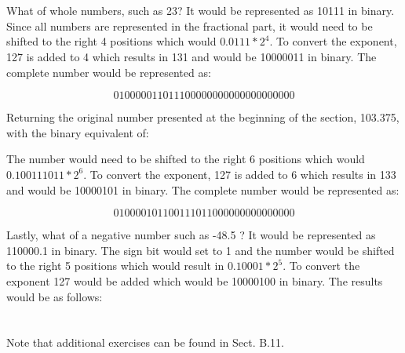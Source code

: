 \documentclass[10pt]{book}
\begin{document}
\section{}
What of whole numbers, such as 23? It would be represented as 10111 in binary. Since all numbers are represented in the fractional part, it would need to be shifted to the right 4 positions which would $0.0111 * 2^{4}$. To convert the exponent, 127 is added to 4 which results in 131 and would be 10000011 in binary. The complete number would be represented as:

$$
010000011011100000000000000000000
$$

Returning the original number presented at the beginning of the section, 103.375, with the binary equivalent of:

The number would need to be shifted to the right 6 positions which would $0.100111011 * 2^{6}$. To convert the exponent, 127 is added to 6 which results in 133 and would be 10000101 in binary. The complete number would be represented as:

$$
010000101100111011000000000000000
$$

Lastly, what of a negative number such as -48.5 ? It would be represented as 110000.1 in binary. The sign bit would set to 1 and the number would be shifted to the right 5 positions which would result in $0.10001 * 2^{5}$. To convert the exponent 127 would be added which would be 10000100 in binary. The results would be as follows:

\section{}
Note that additional exercises can be found in Sect. B.11.
\end{document}
